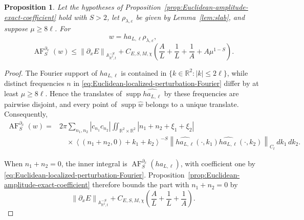 \documentclass[12pt,reqno,letterpaper]{amsart}
\numberwithin{equation}{section}
\newtheorem{proposition}[theorem]{Proposition}
\theoremstyle{definition}
\newcommand{\R}{\mathbb R}
\newcommand{\A}{\mathbb A}
\newcommand{\eps}{\varepsilon}
\newcommand{\la}{\lambda}
\newcommand{\supp}{\operatorname{supp}}
\newcommand{\norm}[1]{\left\lVert #1\right\rVert}
\newcommand{\abs}[1]{\left\lvert #1\right\rvert}
\begin{document}
\begin{proposition}

Let the hypotheses of
Proposition~\ref{prop:Euclidean-amplitude-exact-coefficient} hold with
$S>2$, let
$\rho_{\la,\eps}$ be given by Lemma~\ref{lem:slab}, and suppose
$\mu\geq8\ell$.  For
\[
   w=h a_{L,\ell}\rho_{\la,\eps},
\]
\begin{equation}\label{eq:Euclidean-pure-exact-coefficient}
 \operatorname{AF}^{\partial_x}_S(w)
 \leq\norm{\partial_xE}_{\A^{-S}_{\R^2,t}}
   +C_{E,S,M,\chi}\left(
       \frac{A}{L}+\frac1L+\frac1A+A\mu^{1-S}\right).
\end{equation}
\end{proposition}

\begin{proof}
The Fourier support of $h a_{L,\ell}$ is contained in
$\{k\in\R^2:\abs k\leq2\ell\}$, while
distinct frequencies $n$ in \eqref{eq:Euclidean-localized-perturbation-Fourier} differ by
at least $\mu\geq8\ell$.  Hence the translates of
$\supp\widehat{h a_{L,\ell}}$ by these frequencies are pairwise disjoint,
and every point of $\supp\widehat w$ belongs to a unique translate.
Consequently,
\begin{align*}
 \operatorname{AF}^{\partial_x}_S(w)
 ={}&2\pi\sum_{n_1,n_2}\abs{c_{n_1}c_{n_2}}
 \iint_{\R^2\times\R^2}
   \abs{n_1+n_2+\xi_1+\xi_2}\\
 &\quad\times
   \left\langle(n_1+n_2,0)+k_1+k_2\right\rangle^{-S}
   \norm{\widehat{h a_{L,\ell}}(\cdot,k_1)
          \widehat{h a_{L,\ell}}(\cdot,k_2)}_{C_t}
   \,dk_1\,dk_2.
\end{align*}

When $n_1+n_2=0$, the inner integral is
$\operatorname{AF}^{\partial_x}_S(h a_{L,\ell})$, with coefficient one by
\eqref{eq:Euclidean-localized-perturbation-Fourier}.
Proposition~\ref{prop:Euclidean-amplitude-exact-coefficient} therefore bounds
the part with $n_1+n_2=0$ by
\[
 \norm{\partial_xE}_{\A^{-S}_{\R^2,t}}
 +C_{E,S,M,\chi}\left(\frac AL+\frac1L+\frac1A\right).
\]


\end{proof}
\end{document}

